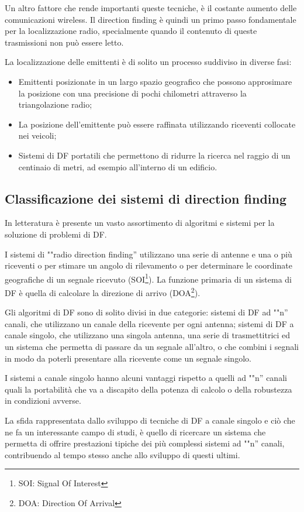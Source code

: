 Un altro fattore che rende importanti queste tecniche, è il costante aumento delle comunicazioni wireless. Il direction finding è quindi un primo passo fondamentale per la localizzazione radio, specialmente quando il contenuto di queste trasmissioni non può essere letto. 

La localizzazione delle emittenti è di solito un processo suddiviso in diverse fasi: 
\begin{itemize}
\item Emittenti posizionate in un largo spazio geografico che possono approsimare la posizione con una precisione di pochi chilometri attraverso la triangolazione radio;
\item La posizione dell'emittente può essere raffinata utilizzando riceventi collocate nei veicoli; 
\item Sistemi di DF portatili che permettono di ridurre la ricerca nel raggio di un centinaio di metri, ad esempio all'interno di un edificio.
\end{itemize}


\subsection{Classificazione dei sistemi di direction finding}

In letteratura è presente un vasto assortimento di algoritmi e sistemi per la soluzione di problemi di DF.

I sistemi di ""radio direction finding'' utilizzano una serie di antenne e una o più riceventi o per stimare un angolo di rilevamento o per determinare le coordinate geografiche di un segnale ricevuto (SOI\footnote{SOI: Signal Of Interest}). La funzione primaria di un sistema di DF è quella di calcolare la direzione di arrivo (DOA\footnote{DOA: Direction Of Arrival}). 

Gli algoritmi di DF sono di solito divisi in due categorie: sistemi di DF ad ""n'' canali, che utilizzano un canale della ricevente per ogni antenna; sistemi di DF a canale singolo, che utilizzano una singola antenna, una serie di trasmettitrici ed un sistema che permetta di passare da un segnale all'altro, o che combini i segnali in modo da poterli presentare alla ricevente come un segnale singolo. 

I sistemi a canale singolo hanno alcuni vantaggi rispetto a quelli ad ""n'' canali quali la portabilità che va a discapito della potenza di calcolo o della robustezza in condizioni avverse. 

La sfida rappresentata dallo sviluppo di tecniche di DF a canale singolo e ciò che ne fa un interessante campo di studi, è quello di ricercare un sistema che permetta di offrire prestazioni tipiche dei più complessi sistemi ad ""n'' canali, contribuendo al tempo stesso anche allo sviluppo di questi ultimi.


